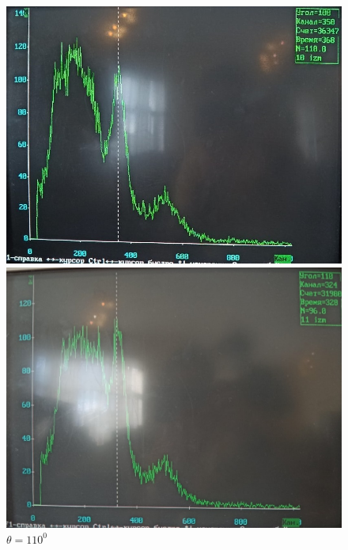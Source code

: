 \documentclass[a4paper, 12pt]{article}%
\begin{document}
\begin{figure}[h]
\begin{minipage}[h]{0.3\linewidth}
\includegraphics[width = 1\linewidth]{13.jpg}
\caption{$\theta = 100^0$}
\end{minipage}
\hfill
\begin{minipage}[h]{0.3\linewidth}
\includegraphics[width = 1\linewidth]{14.jpg}
\caption{$\theta = 110^0$}
\end{minipage}
\hfill
\begin{minipage}[h]{0.3\linewidth}

\end{minipage}
\end{figure}
\end{document}
